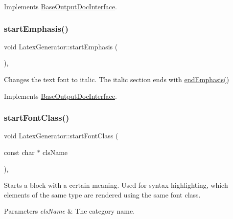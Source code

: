 Implements \mbox{\hyperlink{class_base_output_doc_interface_ac9c801c3ad0b50e3e69be184b50c2fef}{Base\+Output\+Doc\+Interface}}.

\mbox{\label{class_latex_generator_a247441f3922c912966d8193f578f5c74}} 
\subsubsection{\texorpdfstring{startEmphasis()}{startEmphasis()}}
{\footnotesize\ttfamily void Latex\+Generator\+::start\+Emphasis (\begin{DoxyParamCaption}{ }\end{DoxyParamCaption})\hspace{0.3cm}{\ttfamily [inline]}, {\ttfamily [virtual]}}

Changes the text font to italic. The italic section ends with \mbox{\hyperlink{class_latex_generator_a5837f5169fd6b05b088a4d9182756711}{end\+Emphasis()}} 

Implements \mbox{\hyperlink{class_base_output_doc_interface_a21debc3a6c4c58791a41e715dc78f4ab}{Base\+Output\+Doc\+Interface}}.

\mbox{\label{class_latex_generator_a8dc4dcc8aaa2a591a1fb7f06896cd5af}} 
\subsubsection{\texorpdfstring{startFontClass()}{startFontClass()}}
{\footnotesize\ttfamily void Latex\+Generator\+::start\+Font\+Class (\begin{DoxyParamCaption}\item[{const char $\ast$}]{cls\+Name }\end{DoxyParamCaption})\hspace{0.3cm}{\ttfamily [inline]}, {\ttfamily [virtual]}}

Starts a block with a certain meaning. Used for syntax highlighting, which elements of the same type are rendered using the same \textquotesingle{}font class\textquotesingle{}. 
\begin{DoxyParams}{Parameters}
{\em cls\+Name} & The category name. \\
\hline
\end{DoxyParams}


